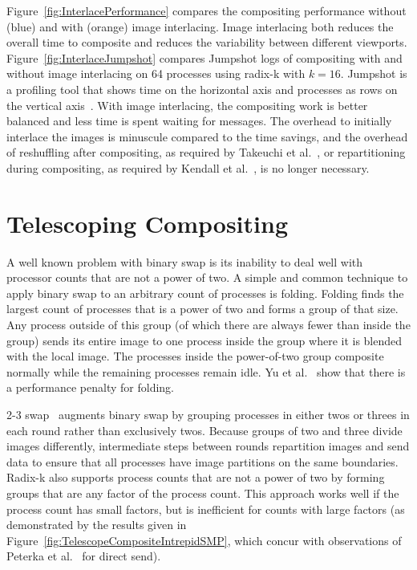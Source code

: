 \documentclass{sig-alternate}
\newcommand*{\lcite}[1]{~\cite{#1}}
\newcommand*{\scite}[1]{~\cite{#1}}
\newcommand{\etal}{et al.}
\begin{document}
Figure~\ref{fig:InterlacePerformance} compares the compositing performance
without (blue) and with (orange) image interlacing.  Image interlacing both
reduces the overall time to composite and reduces the variability between
different viewports.  Figure~\ref{fig:InterlaceJumpshot} compares Jumpshot
logs of compositing with and without image interlacing on 64 processes
using radix-k with $k = 16$.  Jumpshot is a profiling tool that shows time
on the horizontal axis and processes as rows on the vertical
axis\lcite{Chan2008}.  With image interlacing, the compositing work is
better balanced and less time is spent waiting for messages.  The overhead
to initially interlace the images is minuscule compared to the time
savings, and the overhead of reshuffling after compositing, as required by
Takeuchi \etal\scite{Takeuchi2003}, or repartitioning during compositing,
as required by Kendall \etal\scite{Kendall2010}, is no longer necessary.

\section{Telescoping Compositing}
\label{sec:TelescopingCompositing}

A well known problem with binary swap is its inability to deal well with
processor counts that are not a power of two.  A simple and common
technique to apply binary swap to an arbitrary count of processes is
folding.  Folding finds the largest count of processes that is a power of
two and forms a group of that size.  Any process outside of this group (of
which there are always fewer than inside the group) sends its entire image
to one process inside the group where it is blended with the local image.
The processes inside the power-of-two group composite normally while the
remaining processes remain idle.  Yu \etal\scite{23Swap} show that there is
a performance penalty for folding.

2-3 swap\lcite{23Swap} augments binary swap by grouping processes in either
twos or threes in each round rather than exclusively twos.  Because groups
of two and three divide images differently, intermediate steps between
rounds repartition images and send data to ensure that all processes have
image partitions on the same boundaries.  Radix-k also supports process
counts that are not a power of two by forming groups that are any factor of
the process count.  This approach works well if the process count has small
factors, but is inefficient for counts with large factors (as demonstrated
by the results given in Figure~\ref{fig:TelescopeCompositeIntrepidSMP},
which concur with observations of Peterka \etal\scite{Peterka2009} for
direct send).
\end{document}
